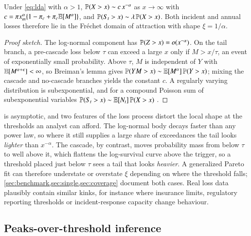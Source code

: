 \begin{lemma}\label{lem:tail}
Under \cref{eq:lda} with $\alpha > 1$, $\mathbb{P}(X > x) \sim c\,x^{-\alpha}$ as $x\to\infty$ with $c = \pi x_m^{\alpha}\{1-\pi_c + \pi_c \mathbb{E}[M^{\alpha}]\}$, and $\mathbb{P}(S_t > x) \sim \lambda\,\mathbb{P}(X > x)$. Both incident and annual losses therefore lie in the Fr\'echet domain of attraction with shape $\xi = 1/\alpha$.
\end{lemma}
\begin{proof}[Proof sketch]
The log-normal component has $\mathbb{P}(Z>x) = o(x^{-\alpha})$. On the tail branch, a pre-cascade loss below $\tau$ can exceed a large $x$ only if $M > x/\tau$, an event of exponentially small probability. Above $\tau$, $M$ is independent of $Y$ with $\mathbb{E}[M^{\alpha+\epsilon}]<\infty$, so Breiman's lemma \citep{breiman1965} gives $\mathbb{P}(YM > x) \sim \mathbb{E}[M^\alpha]\,\mathbb{P}(Y > x)$; mixing the cascade and no-cascade branches yields the constant $c$. A regularly varying distribution is subexponential, and for a compound Poisson sum of subexponential variables $\mathbb{P}(S_t > x) \sim \mathbb{E}[N_t]\,\mathbb{P}(X>x)$ \citep[Section~1.3]{embrechts1997}.
\end{proof}

\begin{remark}\label{rem:kink}
 is asymptotic, and two features of the loss process distort the local shape at the thresholds an analyst can afford. The log-normal body decays faster than any power law, so where it still supplies a large share of exceedances the tail looks \emph{lighter} than $x^{-\alpha}$. The cascade, by contrast, moves probability mass from below $\tau$ to well above it, which flattens the log-survival curve above the trigger, so a threshold placed just below $\tau$ sees a tail that looks \emph{heavier}. A generalized Pareto fit can therefore understate or overstate $\xi$ depending on where the threshold falls; \cref{sec:benchmark,sec:single,sec:coverage} document both cases. Real loss data plausibly contain similar kinks, for instance where insurance limits, regulatory reporting thresholds or incident-response capacity change behaviour.
\end{remark}

\subsection{Peaks-over-threshold inference}\label{sec:evt}


